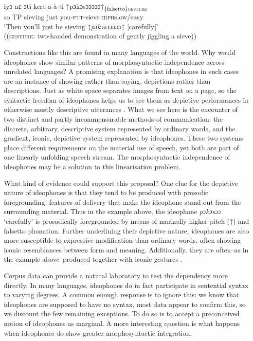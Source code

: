 \documentclass[output=paper]{langsci/langscibook}
\begin{document}
\ea
\gll   iyɔ  nɛ  ɔti  kere  a-à-\textup{{\textbar}}ti  ↑pɔkɔsɔɔɔɔɔ↑\textup{\textsubscript{\{falsetto\}}}\textup{ {\textbar}}\textsc{\textsubscript{gesture}}\\
  {{so}}  TP  {{sieving}}  {{just}}  {you-\textsc{fut}-sieve}  {\textsc{idph}}{{slow/easy}}\\
\glt ‘Then you’ll just be sieving ↑\textit{pɔkɔsɔɔɔɔɔ}↑ [carefully]’ \\
((\textsc{gesture}: two-handed demonstration of gently jiggling a sieve))
\z



  Constructions like this are found in many languages of the world. Why would ideophones show similar patterns of morphosyntactic independence across unrelated languages? A promising explanation is that ideophones in such cases are an instance of showing rather than saying, depictions  rather than descriptions. Just as white space separates images from text on a page, so the syntactic freedom of ideophones helps us to see them as depictive performances in otherwise mostly descriptive utterances \citep{Kunene1965}. What we see here is the encounter of two distinct and partly incommensurable methods of communication: the discrete, arbitrary, descriptive system represented by ordinary words, and the gradient, iconic,  depictive system represented by ideophones. These two systems place different requirements on the material use of speech, yet both are part of one linearly unfolding speech stream. The morphosyntactic independence of ideophones may be a solution to this linearisation problem. 



What kind of evidence could support this proposal? One clue for the depictive nature of ideophones is that they tend to be produced with prosodic foregrounding: features of delivery that make the ideophone stand out from the surrounding material. Thus in the  example above, the ideophone \textit{pɔkɔsɔɔ} ‘carefully’ is prosodically foregrounded by means of markedly higher pitch (↑) and falsetto phonation. Further underlining their depictive nature, ideophones are also more susceptible to expressive modification than ordinary words, often showing iconic resemblances between form and meaning. Additionally, they are often--as in the example above--produced together with iconic gestures \citep{Nuckolls1996}.   



 Corpus data can provide a natural laboratory to test the dependency more directly. In many languages, ideophones do in fact participate in sentential syntax to varying degrees. A common enough response is to ignore this: we know that ideophones are supposed to have no syntax, most data appear to confirm this, so we discount the few remaining exceptions. To do so is to accept a preconceived notion of ideophones as marginal. A more interesting question is what happens when ideophones do show greater morphosyntactic integration. 
\end{document}
